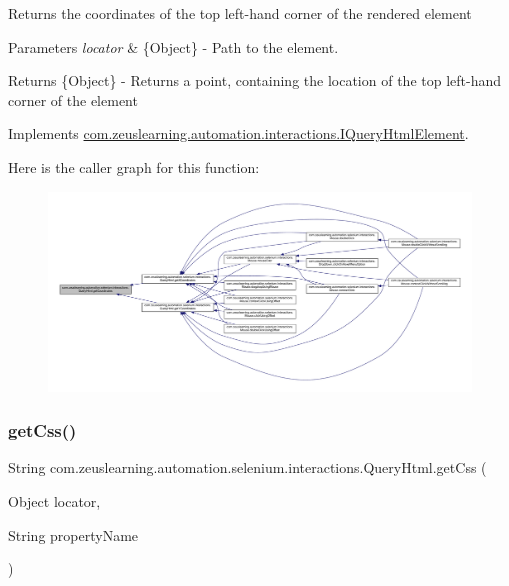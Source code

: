 Returns the coordinates of the top left-\/hand corner of the rendered element


\begin{DoxyParams}{Parameters}
{\em locator} & \{Object\} -\/ Path to the element. \\
\hline
\end{DoxyParams}
\begin{DoxyReturn}{Returns}
\{Object\} -\/ Returns a point, containing the location of the top left-\/hand corner of the element 
\end{DoxyReturn}


Implements \hyperlink{interfacecom_1_1zeuslearning_1_1automation_1_1interactions_1_1IQueryHtmlElement_a7e632b8b3ccb6f9446e65dcf961d5d9a}{com.\+zeuslearning.\+automation.\+interactions.\+I\+Query\+Html\+Element}.

Here is the caller graph for this function\+:
\nopagebreak
\begin{figure}[H]
\begin{center}
\leavevmode
\includegraphics[width=350pt]{dc/d41/classcom_1_1zeuslearning_1_1automation_1_1selenium_1_1interactions_1_1QueryHtml_a52ce1e529bfd5416349e82671c33e480_icgraph}
\end{center}
\end{figure}
\hypertarget{classcom_1_1zeuslearning_1_1automation_1_1selenium_1_1interactions_1_1QueryHtml_aeb4ba1cab004dc64db959c70a78fd0ab}{}\label{classcom_1_1zeuslearning_1_1automation_1_1selenium_1_1interactions_1_1QueryHtml_aeb4ba1cab004dc64db959c70a78fd0ab} 
\subsubsection{\texorpdfstring{get\+Css()}{getCss()}}
{\footnotesize\ttfamily String com.\+zeuslearning.\+automation.\+selenium.\+interactions.\+Query\+Html.\+get\+Css (\begin{DoxyParamCaption}\item[{Object}]{locator,  }\item[{String}]{property\+Name }\end{DoxyParamCaption})\hspace{0.3cm}{\ttfamily [inline]}}

